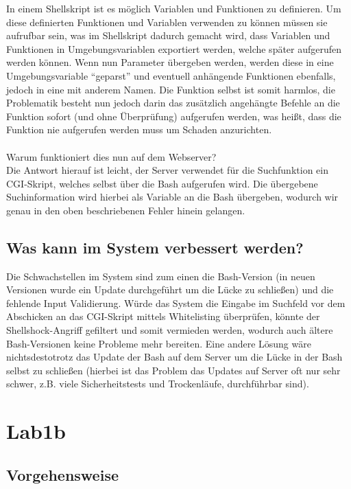 \documentclass[12pt,a4paper,titlepage,oneside]{scrartcl}
\begin{document}
In einem Shellskript ist es möglich Variablen und Funktionen zu definieren. Um diese definierten Funktionen und Variablen verwenden zu können müssen sie aufrufbar sein, was im Shellskript dadurch gemacht wird, dass Variablen und Funktionen in Umgebungsvariablen exportiert werden, welche später aufgerufen werden können. Wenn nun Parameter übergeben werden, werden diese in eine Umgebungsvariable "`geparst"' und eventuell anhängende Funktionen ebenfalls, jedoch in eine mit anderem Namen. Die Funktion selbst ist somit harmlos, die Problematik besteht nun jedoch darin das zusätzlich angehängte Befehle an die Funktion sofort (und ohne Überprüfung) aufgerufen werden, was heißt, dass die Funktion nie aufgerufen werden muss um Schaden anzurichten. \\
\\
Warum funktioniert dies nun auf dem Webserver? \\
Die Antwort hierauf ist leicht, der Server verwendet für die Suchfunktion ein CGI-Skript, welches selbst über die Bash aufgerufen wird. Die übergebene Suchinformation wird hierbei als Variable an die Bash übergeben, wodurch wir genau in den oben beschriebenen Fehler hinein gelangen.

\subsection{Was kann im System verbessert werden?}

Die Schwachstellen im System sind zum einen die Bash-Version (in neuen Versionen wurde ein Update durchgeführt um die Lücke zu schließen) und die fehlende Input Validierung. Würde das System die Eingabe im Suchfeld vor dem Abschicken an das CGI-Skript mittels Whitelisting überprüfen, könnte der Shellshock-Angriff gefiltert und somit vermieden werden, wodurch auch ältere Bash-Versionen keine Probleme mehr bereiten. Eine andere Lösung wäre nichtsdestotrotz das Update der Bash auf dem Server um die Lücke in der Bash selbst zu schließen (hierbei ist das Problem das Updates auf Server oft nur sehr schwer, z.B. viele Sicherheitstests und Trockenläufe, durchführbar sind).

\section{Lab1b}

\subsection{Vorgehensweise}
\end{document}
